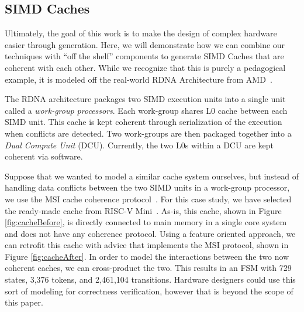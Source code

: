 \documentclass[sigplan,anonymous,review]{acmart}
\begin{document}
\subsection{SIMD Caches}\label{sec:cache}
Ultimately, the goal of this work is to make the design of complex hardware easier through generation. Here, we will demonstrate how we can combine our techniques with ``off the shelf'' components to generate SIMD Caches that are coherent with each other. While we recognize that this is purely a pedagogical example, it is modeled off the real-world RDNA Architecture from AMD~\cite{}.

The RDNA architecture packages two SIMD execution units into a single unit called a \textit{work-group processors}. Each work-group shares L0 cache between each SIMD unit. This cache is kept coherent through serialization of the execution when conflicts are detected. Two work-groups are then packaged together into a \textit{Dual Compute Unit} (DCU). Currently, the two L0s within a DCU are kept coherent via software. 

Suppose that we wanted to model a similar cache system ourselves, but instead of handling data conflicts between the two SIMD units in a work-group processor, we use the MSI cache coherence protocol~\cite{}. For this case study, we have selected the ready-made cache from RISC-V Mini~\cite{}. As-is, this cache, shown in Figure \ref{fig:cacheBefore}, is directly connected to main memory in a single core system and does not have any coherence protocol. Using a feature oriented approach, we can retrofit this cache with advice that implements the MSI protocol, shown in Figure \ref{fig:cacheAfter}. In order to model the interactions between the two now coherent caches, we can cross-product the two. This results in an FSM with 729 states, 3,376 tokens, and 2,461,104 transitions. Hardware designers could use this sort of modeling for correctness verification, however that is beyond the scope of this paper.
\end{document}
